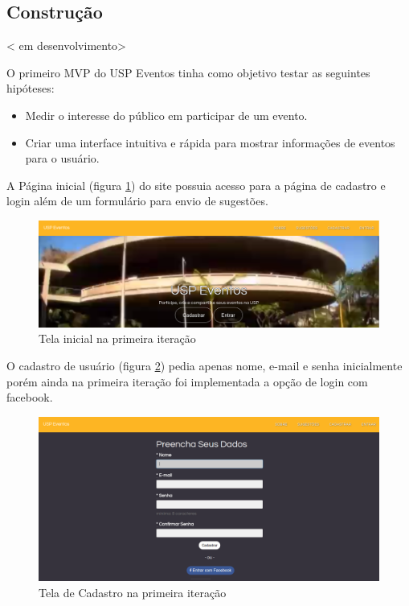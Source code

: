 \subsection{Construção}
< em desenvolvimento>
         \par O primeiro MVP do USP Eventos tinha como objetivo testar as seguintes hipóteses:
         \begin{itemize}
         \item Medir o interesse do público em participar de um evento.
         \item Criar uma interface intuitiva e rápida para mostrar informações de eventos para o usuário.
         \end{itemize}
        \par A Página inicial (figura \ref{fig:landing_pagev1}) do site possuia acesso para a página de cadastro e login além de um formulário para envio de sugestões.
        \begin{figure}[htb]
		\includegraphics[width=15cm]{figuras/landing_pagev1}
		\caption{\label{fig:landing_pagev1} Tela inicial na primeira iteração }
		\end{figure}
        \par O cadastro de usuário (figura \ref{fig:sign_upv1}) pedia apenas nome, e-mail e senha inicialmente porém ainda na primeira iteração foi implementada a opção de login com facebook.
        \begin{figure}[htb]
		\includegraphics[width=15cm]{figuras/sign_upv1}
		\caption{\label{fig:sign_upv1} Tela de Cadastro na primeira iteração}
		\end{figure}
